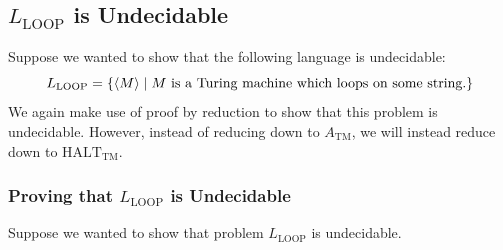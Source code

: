 \documentclass[letterpaper]{article}
\begin{document}
\subsection{\texorpdfstring{$L_{\text{LOOP}}$}{} is Undecidable}
Suppose we wanted to show that the following language is undecidable: 
\[L_{\text{LOOP}} = \{\langle M \rangle \mid M \text{ is a Turing machine which loops on some string.}\}\]
We again make use of proof by reduction to show that this problem is undecidable. However, instead of reducing down to $A_{\text{TM}}$, we will instead reduce down to $\text{HALT}_{\text{TM}}$. 

\subsubsection{Proving that \texorpdfstring{$L_{\text{LOOP}}$}{} is Undecidable}
Suppose we wanted to show that problem $L_{\text{LOOP}}$ is undecidable. 
\end{document}
